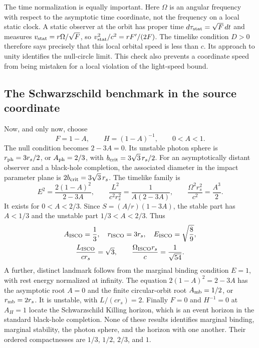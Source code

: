 \documentclass[10pt,twocolumn,letterpaper]{article}
\begin{document}
The time normalization is equally important. Here $\Omega$ is an
angular frequency with respect to the asymptotic time coordinate,
not the frequency on a local static clock. A static observer at the
orbit has proper time $d\tau_{\rm stat}=\sqrt F\,dt$ and measures
$v_{\rm stat}=r\Omega/\sqrt F$, so
$v_{\rm stat}^2/c^2=rF'/(2F)$. The timelike condition $D>0$
therefore says precisely that this local orbital speed is less than
$c$. Its approach to unity identifies the null-circle limit. This
check also prevents a coordinate speed from being mistaken for a
local violation of the light-speed bound.

\subsection{The Schwarzschild benchmark in the source coordinate}
Now, and only now, choose
\begin{equation}
 F=1-A,\qquad H=(1-A)^{-1},\qquad 0<A<1.
 \label{eq:orbit-schwarzschild-adapter}
\end{equation}
The null condition becomes $2-3A=0$. Its unstable photon sphere is
$r_{\rm ph}=3r_s/2$, or $A_{\rm ph}=2/3$, with
$b_{\rm crit}=3\sqrt3\,r_s/2$. For an asymptotically distant observer
and a black-hole completion, the associated diameter in the impact
parameter plane is $2b_{\rm crit}=3\sqrt3\,r_s$.
The timelike family is
\begin{equation}
 E^2=\frac{2(1-A)^2}{2-3A},\qquad
 \frac{L^2}{c^2r_s^2}=\frac{1}{A(2-3A)},\qquad
 \frac{\Omega^2r_s^2}{c^2}=\frac{A^3}{2}.
 \label{eq:orbit-schwarzschild-family}
\end{equation}
It exists for $0<A<2/3$. Since
$S=(A/r)(1-3A)$, the stable part has $A<1/3$ and the unstable
part $1/3<A<2/3$. Thus
\begin{equation}
 \begin{gathered}
 A_{\rm ISCO}=\frac13,\quad r_{\rm ISCO}=3r_s,\quad E_{\rm ISCO}=\sqrt{\frac89},\\
 \frac{L_{\rm ISCO}}{cr_s}=\sqrt3,\qquad
 \frac{\Omega_{\rm ISCO}r_s}{c}=\frac1{\sqrt{54}}.
 \end{gathered}
 \label{eq:orbit-isco-packet}
\end{equation}
A further, distinct landmark follows from the marginal binding
condition $E=1$, with rest energy normalized at infinity.
The equation $2(1-A)^2=2-3A$ has the asymptotic root $A=0$ and
the finite circular-orbit root $A_{\rm mb}=1/2$, or $r_{\rm mb}=2r_s$.
It is unstable, with $L/(cr_s)=2$. Finally $F=0$ and $H^{-1}=0$
at $A_H=1$ locate the Schwarzschild Killing horizon, which is an event
horizon in the standard black-hole completion. None of these results
identifies marginal binding, marginal stability, the photon sphere,
and the horizon with one another. Their ordered compactnesses are
$1/3$, $1/2$, $2/3$, and $1$.
\end{document}
